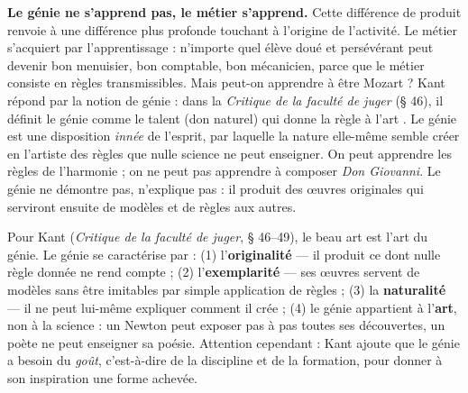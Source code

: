 \documentclass[11pt]{article}
\newcommand{\cle}[1]{{\popxbold\color{popdark}#1}}
\begin{document}
\textbf{Le génie ne s'apprend pas, le métier s'apprend.} Cette différence de produit renvoie à une différence plus profonde touchant à l'origine de l'activité. Le métier s'acquiert par l'apprentissage : n'importe quel élève doué et persévérant peut devenir bon menuisier, bon comptable, bon mécanicien, parce que le métier consiste en règles transmissibles. Mais peut-on apprendre à être Mozart ? Kant répond par la notion de \cle{génie} : dans la \emph{Critique de la faculté de juger} (§ 46), il définit le génie comme \guillemotleft le talent (don naturel) qui donne la règle à l'art \guillemotright. Le génie est une disposition \emph{innée} de l'esprit, par laquelle la nature elle-même semble créer en l'artiste des règles que nulle science ne peut enseigner. On peut apprendre les règles de l'harmonie ; on ne peut pas apprendre à composer \emph{Don Giovanni}. Le génie ne démontre pas, n'explique pas : il produit des œuvres originales qui serviront ensuite de modèles et de règles aux autres.

\begin{propriete}
Pour Kant (\emph{Critique de la faculté de juger}, § 46--49), le beau art est l'art du génie. Le génie se caractérise par : (1) l'\textbf{originalité} — il produit ce dont nulle règle donnée ne rend compte ; (2) l'\textbf{exemplarité} — ses œuvres servent de modèles sans être imitables par simple application de règles ; (3) la \textbf{naturalité} — il ne peut lui-même expliquer comment il crée ; (4) le génie appartient à l'\textbf{art}, non à la science : un Newton peut exposer pas à pas toutes ses découvertes, un poète ne peut enseigner sa poésie. Attention cependant : Kant ajoute que le génie a besoin du \emph{goût}, c'est-à-dire de la discipline et de la formation, pour donner à son inspiration une forme achevée.
\end{propriete}
\end{document}

